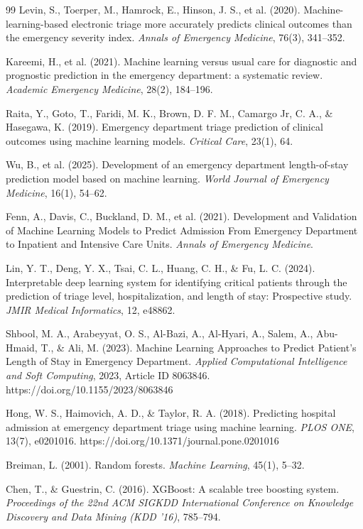 \documentclass[harvard,article]{frontiersinFPHY_FAMS}
\begin{document}
\begin{thebibliography}{99}
 Levin, S., Toerper, M., Hamrock, E., Hinson, J. S., et al. (2020). Machine-learning-based electronic triage more accurately predicts clinical outcomes than the emergency severity index. \textit{Annals of Emergency Medicine}, 76(3), 341--352.

 Kareemi, H., et al. (2021). Machine learning versus usual care for diagnostic and prognostic prediction in the emergency department: a systematic review. \textit{Academic Emergency Medicine}, 28(2), 184--196.

 Raita, Y., Goto, T., Faridi, M. K., Brown, D. F. M., Camargo Jr, C. A., \& Hasegawa, K. (2019). Emergency department triage prediction of clinical outcomes using machine learning models. \textit{Critical Care}, 23(1), 64.

 Wu, B., et al. (2025). Development of an emergency department length-of-stay prediction model based on machine learning. \textit{World Journal of Emergency Medicine}, 16(1), 54--62.

 Fenn, A., Davis, C., Buckland, D. M., et al. (2021). Development and Validation of Machine Learning Models to Predict Admission From Emergency Department to Inpatient and Intensive Care Units. \textit{Annals of Emergency Medicine}.

 Lin, Y. T., Deng, Y. X., Tsai, C. L., Huang, C. H., \& Fu, L. C. (2024). Interpretable deep learning system for identifying critical patients through the prediction of triage level, hospitalization, and length of stay: Prospective study. \textit{JMIR Medical Informatics}, 12, e48862.

 Shbool, M. A., Arabeyyat, O. S., Al-Bazi, A., Al-Hyari, A., Salem, A., Abu-Hmaid, T., \& Ali, M. (2023). Machine Learning Approaches to Predict Patient's Length of Stay in Emergency Department. \textit{Applied Computational Intelligence and Soft Computing}, 2023, Article ID 8063846. https://doi.org/10.1155/2023/8063846

 Hong, W. S., Haimovich, A. D., \& Taylor, R. A. (2018). Predicting hospital admission at emergency department triage using machine learning. \textit{PLOS ONE}, 13(7), e0201016. https://doi.org/10.1371/journal.pone.0201016

 Breiman, L. (2001). Random forests. \textit{Machine Learning}, 45(1), 5--32.

 Chen, T., \& Guestrin, C. (2016). XGBoost: A scalable tree boosting system. \textit{Proceedings of the 22nd ACM SIGKDD International Conference on Knowledge Discovery and Data Mining (KDD '16)}, 785--794.


\end{thebibliography}
\end{document}
